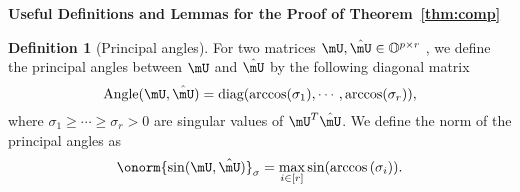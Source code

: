 \documentclass[lettersize,onecolumn,journal]{IEEEtran}
\theoremstyle{definition}
\theoremstyle{definition}
\newtheorem{defn}{Definition}
\newcommand{\of}[1]{\left(#1\right)}
\def\fixme#1#2{\textbf{\color{red}[FIXME (#1): #2]}}
\begin{document}
{\bf Useful Definitions and Lemmas for the Proof of Theorem~\ref{thm:comp}} 
\begin{defn}[Principal angles] For two matrices $\mU, \hat \mU \in \mathbb{O}^{p \times r}$ %
, we define the principal angles between $\mU$ and $\hat \mU$ by the following diagonal matrix
\begin{equation}
    \text{Angle}(\mU, \hat \mU) = \text{diag}( \arccos(\sigma_1), \cdots, \arccos (\sigma_r) ),
\end{equation}
where $\sigma_1 \geq \cdots \geq \sigma_r>0$ are singular values of $\mU^T \hat \mU$. 
We define the norm of the principal angles as 
\begin{equation}
     \onorm{\sin(\mU, \hat \mU)}_{\sigma} = \max_{i \in [r]} \sin ( \arccos \of{ \sigma_i} ).
\end{equation}




\end{defn}



\end{document}
